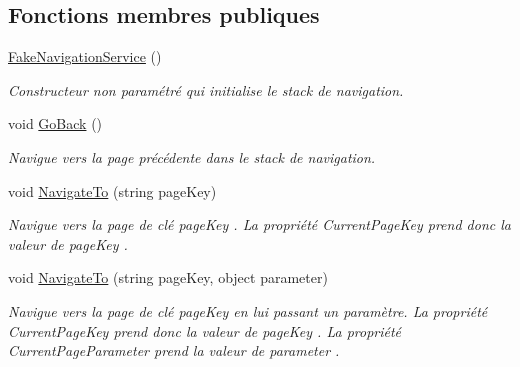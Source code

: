 \subsection*{Fonctions membres publiques}
\begin{DoxyCompactItemize}
\item 
\hyperlink{class_boxes_1_1_tests_1_1_mock_1_1_services_1_1_fake_navigation_service_aceadde6c61562278fce55e793434f934}{Fake\+Navigation\+Service} ()
\begin{DoxyCompactList}\small\item\em Constructeur non paramétré qui initialise le stack de navigation. \end{DoxyCompactList}\item 
void \hyperlink{class_boxes_1_1_tests_1_1_mock_1_1_services_1_1_fake_navigation_service_a27266175146d23c89c997e637e3c8813}{Go\+Back} ()
\begin{DoxyCompactList}\small\item\em Navigue vers la page précédente dans le stack de navigation. \end{DoxyCompactList}\item 
void \hyperlink{class_boxes_1_1_tests_1_1_mock_1_1_services_1_1_fake_navigation_service_a0459ed72ee0a07da55556de2cff5182f}{Navigate\+To} (string page\+Key)
\begin{DoxyCompactList}\small\item\em Navigue vers la page de clé {\itshape page\+Key} . La propriété {\ttfamily Current\+Page\+Key} prend donc la valeur de {\itshape page\+Key} . \end{DoxyCompactList}\item 
void \hyperlink{class_boxes_1_1_tests_1_1_mock_1_1_services_1_1_fake_navigation_service_a4471c5eaa01e36727efd13c6b25936d8}{Navigate\+To} (string page\+Key, object parameter)
\begin{DoxyCompactList}\small\item\em Navigue vers la page de clé {\itshape page\+Key}  en lui passant un paramètre. La propriété {\ttfamily Current\+Page\+Key} prend donc la valeur de {\itshape page\+Key} . La propriété {\ttfamily Current\+Page\+Parameter} prend la valeur de {\itshape parameter} . \end{DoxyCompactList}\end{DoxyCompactItemize}
